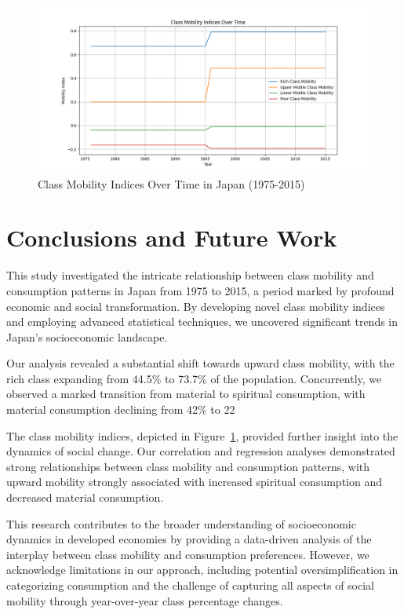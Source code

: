\documentclass{article} %
\begin{document}
\begin{figure}[h]
    \centering
    \includegraphics[width=\textwidth]{class_mobility.png}
    \caption{Class Mobility Indices Over Time in Japan (1975-2015)}
    \label{fig:class_mobility}
\end{figure}

\section{Conclusions and Future Work}
\label{sec:conclusion}

This study investigated the intricate relationship between class mobility and consumption patterns in Japan from 1975 to 2015, a period marked by profound economic and social transformation. By developing novel class mobility indices and employing advanced statistical techniques, we uncovered significant trends in Japan's socioeconomic landscape.

Our analysis revealed a substantial shift towards upward class mobility, with the rich class expanding from 44.5\% to 73.7\% of the population. Concurrently, we observed a marked transition from material to spiritual consumption, with material consumption declining from 42\% to 22%

The class mobility indices, depicted in Figure~\ref{fig:class_mobility}, provided further insight into the dynamics of social change. Our correlation and regression analyses demonstrated strong relationships between class mobility and consumption patterns, with upward mobility strongly associated with increased spiritual consumption and decreased material consumption.

This research contributes to the broader understanding of socioeconomic dynamics in developed economies by providing a data-driven analysis of the interplay between class mobility and consumption preferences. However, we acknowledge limitations in our approach, including potential oversimplification in categorizing consumption and the challenge of capturing all aspects of social mobility through year-over-year class percentage changes.
\end{document}
